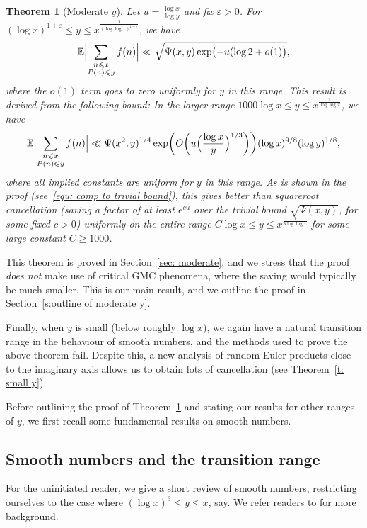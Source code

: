 \documentclass[12pt,a4paper,reqno]{amsart}
\numberwithin{equation}{section}
\def\E{\mathbb E}
\def\leq {\leqslant}
\newtheorem{theorem}{Theorem}[section]
\theoremstyle{remark}
\theoremstyle{definition}
\numberwithin{equation}{section}
\theoremstyle{remark}
\def\E{\mathbb E}
\begin{document}
\begin{theorem}[Moderate $y$]\label{Thm: main quantitative}
Let $u = \frac{\log x}{\log y}$ and fix $\varepsilon > 0$. For $(\log x)^{1 + \varepsilon} \leq y \leq x^{\frac{1}{(\log \log x)^{1 + \varepsilon}}}$, we have
\begin{equation}\label{equ: alt statement}
\E \Bigl| \sum_{\substack{n \leq x \\ P(n) \leq y}} f(n) \Bigr| \ll \sqrt{\Psi(x,y) \exp \bigl( -u (\log 2 + o(1) \bigr)},
\end{equation}
where the $o(1)$ term goes to zero uniformly for $y$ in this range. This result is derived from the following bound: In the larger range $1000 \log x \leq y \leq x^{\frac{1}{\log \log x}} $, we have
\[
\E \Bigl| \sum_{\substack{n \leq x \\ P(n) \leq y}} f(n) \Bigr| \ll \Psi(x^2, y)^{1/4} \exp \biggl( O \biggl( u \Bigl( \frac{\log x}{y} \Bigr)^{1/3} \biggr) \biggr) (\log x)^{9/8} (\log y)^{1/8},
\]
where all implied constants are uniform for $y$ in this range. As is shown in the proof (see~\eqref{equ: comp to trivial bound}), this
gives better than squareroot cancellation (saving a factor of at least $e^{cu}$ over the trivial bound $\sqrt{\Psi(x,y)}$, for some fixed $c>0$) uniformly on the entire range $C \log x \leq y \leq x^{\frac{1}{3 \log \log x}} $ for some large constant $C \geq 1000$.
\end{theorem}
This theorem is proved in Section~\ref{sec: moderate}, and we stress that the proof \emph{does not} make use of critical GMC phenomena, where the saving would typically be much smaller. This is our main result, and we outline the proof in Section~\ref{s:outline of moderate y}. 

Finally, when $y$ is small (below roughly $\log x$), we again have a natural transition range in the behaviour of smooth numbers, and the methods used to prove the above theorem fail. Despite this, a new analysis of random Euler products close to the imaginary axis allows us to obtain lots of cancellation (see Theorem~\ref{t: small y}). 

Before outlining the proof of Theorem~\ref{Thm: main quantitative} and stating our results for other ranges of $y$, we first recall some fundamental results on smooth numbers.

\subsection{Smooth numbers and the transition range}\label{s:smooths intro}
For the uninitiated reader, we give a short review of smooth numbers, restricting ourselves to the case where $(\log x)^3 \leq y \leq x$, say. We refer readers to \cite{Gran08} for more background. 
\end{document}
